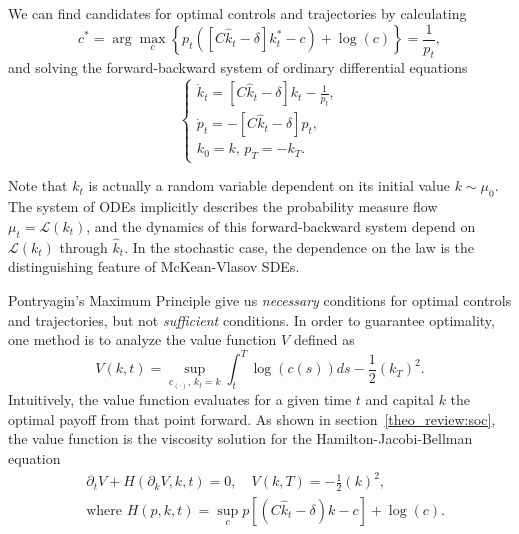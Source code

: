 We can find candidates for optimal controls and trajectories by calculating
\begin{equation*}
    c^* = \arg\max_c  \left\{ p_t\left( \left[C {\hat k_t} - \delta \right]k^*_t - c \right) + \log(c) \right\} = \frac{1}{p_t},
\end{equation*}
and solving the forward-backward system of ordinary differential equations
\begin{equation}\label{economic_example:ode_formulation}
    \begin{cases}
         \dot k_t = \left[ C {\hat k_t} - \delta \right] k_t - \frac{1}{p_t},\\
         \dot p_t = -  \left[C{\hat k_t} - \delta \right] p_t, \\
         k_0 = k,\, p_T =  - k_T.         
    \end{cases}
\end{equation}
\begin{remark}
    Note that $k_t$ is actually a random variable dependent on its initial value $k\sim \mu_0$.
    The system of ODEs implicitly describes the probability measure flow $\mu_t = \mathcal{L}(k_t)$,
    and the dynamics of this forward-backward system depend on $\mathcal{L}(k_t)$ through $\hat k_t$.
    In the stochastic case, the dependence on the law is the distinguishing feature of McKean-Vlasov SDEs.
\end{remark}
    Pontryagin's Maximum Principle give us \textit{necessary} conditions for optimal controls and trajectories, but not \textit{sufficient} conditions.
    In order to guarantee optimality, one method is to analyze the value function $V$ defined as
\begin{equation}\label{economic_example:value_function_definition}
    V(k,t) = \sup_{c_{(\cdot)},\, k_t = k} \int_t^T \log(c(s)) ds -\frac{1}{2}{(k_T)}^2.
\end{equation}
Intuitively, the value function evaluates for a given time $t$ and capital $k$ the optimal payoff from that point forward.
As shown in section~\ref{theo_review:soc}, the value function is the viscosity solution for the Hamilton-Jacobi-Bellman equation
\begin{equation}\label{economic_example:hjb_equation_reduced}
    \begin{split}
        &\partial_t V + H(\partial_k V, k,t) = 0,\quad V(k,T) = -\frac{1}{2}{(k)}^2,\\
        &\text{where }
        H(p,k,t) = \sup_{c} p\left[ \left(C {\hat k_t - \delta}\right)k - c \right] + \log(c).
    \end{split}
\end{equation}
